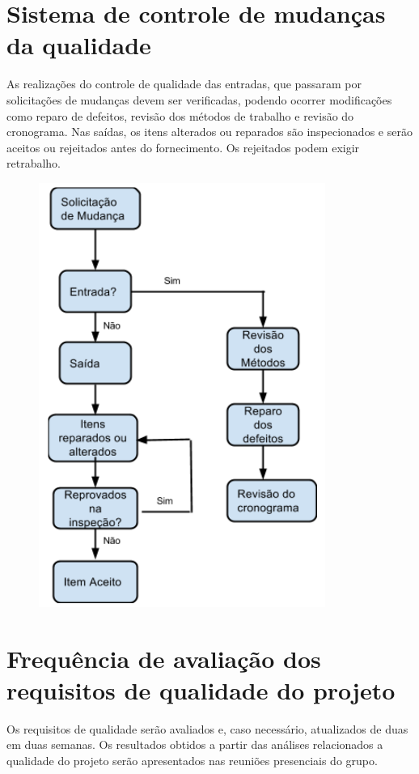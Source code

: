\documentclass[12pt,openright,oneside,a4paper,brazil]{abntex2}
\begin{document}
 \section{Sistema de controle de mudanças da qualidade}
 As realizações do controle de qualidade das entradas, que passaram por solicitações de mudanças devem ser verificadas, podendo ocorrer modificações como reparo de defeitos, revisão dos métodos de trabalho e revisão do cronograma. Nas saídas, os itens alterados ou reparados são inspecionados e serão aceitos ou rejeitados antes do fornecimento. Os rejeitados podem exigir retrabalho.
 \begin{figure}[h]
 \begin{center}

\includegraphics[scale=0.6]{mudanca}
\label{Mudanca}
 \end{center}
 \end{figure}
 \FloatBarrier
 
 \section{Frequência de avaliação dos requisitos de qualidade do projeto}
 Os requisitos de qualidade serão avaliados e, caso necessário, atualizados de duas em duas semanas. Os resultados obtidos a partir das análises relacionados a qualidade do projeto serão apresentados nas reuniões presenciais do grupo.
\end{document}

